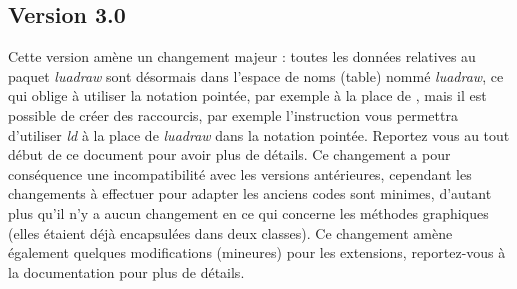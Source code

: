 \subsection{Version 3.0}
Cette version amène un changement majeur : toutes les données relatives au paquet \emph{luadraw} sont désormais dans l'espace de noms (table) nommé \emph{luadraw}, ce qui oblige à utiliser la notation pointée, par exemple  à la place de , mais il est possible de créer des raccourcis, par exemple l'instruction  vous permettra d'utiliser \emph{ld} à la place de \emph{luadraw} dans la notation pointée. Reportez vous au tout début de ce document pour avoir plus de détails.
Ce changement a pour conséquence une incompatibilité avec les versions antérieures, cependant les changements à effectuer pour adapter les anciens codes sont minimes, d'autant plus qu'il n'y a aucun changement en ce qui concerne les méthodes graphiques (elles étaient déjà encapsulées dans deux classes).
Ce changement amène également quelques modifications (mineures) pour les extensions, reportez-vous à la documentation pour plus de détails.

